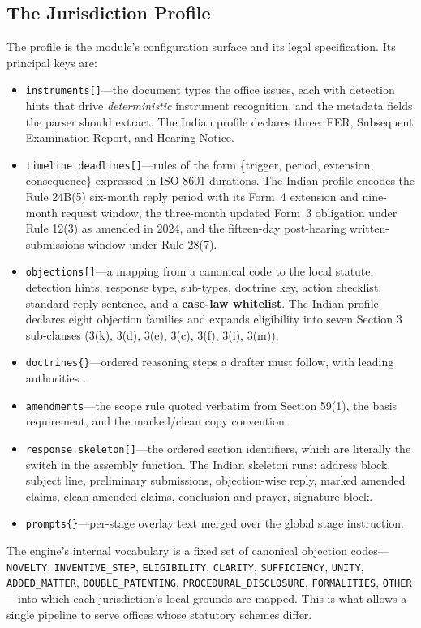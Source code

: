 \documentclass[conference]{IEEEtran}
\newcommand{\code}[1]{\texttt{\small #1}}
\begin{document}
\subsection{The Jurisdiction Profile}

The profile is the module's configuration surface and its legal specification. Its principal keys are:

\begin{itemize}
\item \code{instruments[]}---the document types the office issues, each with detection hints that drive \emph{deterministic} instrument recognition, and the metadata fields the parser should extract. The Indian profile declares three: FER, Subsequent Examination Report, and Hearing Notice.
\item \code{timeline.deadlines[]}---rules of the form \{trigger, period, extension, consequence\} expressed in ISO-8601 durations. The Indian profile encodes the Rule 24B(5) six-month reply period with its Form~4 extension and nine-month request window, the three-month updated Form~3 obligation under Rule 12(3) as amended in 2024, and the fifteen-day post-hearing written-submissions window under Rule 28(7).
\item \code{objections[]}---a mapping from a canonical code to the local statute, detection hints, response type, sub-types, doctrine key, action checklist, standard reply sentence, and a \textbf{case-law whitelist}. The Indian profile declares eight objection families and expands eligibility into seven Section 3 sub-clauses (3(k), 3(d), 3(e), 3(c), 3(f), 3(i), 3(m)).
\item \code{doctrines\{\}}---ordered reasoning steps a drafter must follow, with leading authorities \cite{novartis,ferid,cri2017}.
\item \code{amendments}---the scope rule quoted verbatim from Section 59(1), the basis requirement, and the marked/clean copy convention.
\item \code{response.skeleton[]}---the ordered section identifiers, which are literally the switch in the assembly function. The Indian skeleton runs: address block, subject line, preliminary submissions, objection-wise reply, marked amended claims, clean amended claims, conclusion and prayer, signature block.
\item \code{prompts\{\}}---per-stage overlay text merged over the global stage instruction.
\end{itemize}

The engine's internal vocabulary is a fixed set of canonical objection codes---\code{NOVELTY}, \code{INVENTIVE\_STEP}, \code{ELIGIBILITY}, \code{CLARITY}, \code{SUFFICIENCY}, \code{UNITY}, \code{ADDED\_MATTER}, \code{DOUBLE\_PATENTING}, \code{PROCEDURAL\_DISCLOSURE}, \code{FORMALITIES}, \code{OTHER}---into which each jurisdiction's local grounds are mapped. This is what allows a single pipeline to serve offices whose statutory schemes differ.
\end{document}
